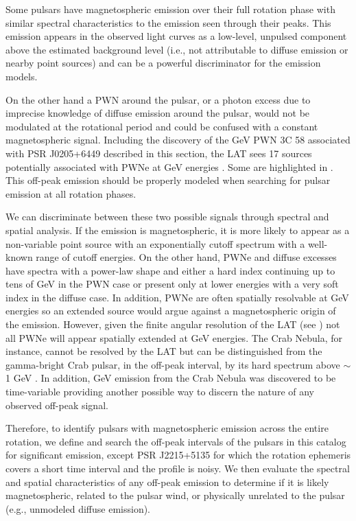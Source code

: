 Some pulsars have magnetospheric emission over their full rotation phase
with similar spectral characteristics to the emission seen through
their peaks.  This emission appears in the observed light curves as
a low-level, unpulsed component above the estimated background level
(i.e., not attributable to diffuse emission or nearby point sources)
and can be a powerful discriminator for the emission models.

On the other hand a PWN around the pulsar, or a photon excess due
to imprecise knowledge of diffuse emission around the pulsar, would
not be modulated at the rotational period and could be confused with
a constant magnetospheric signal.  Including the discovery of the GeV
PWN 3C 58 associated with PSR J0205+6449 described in this section, the
LAT sees 17 sources potentially associated with PWNe at GeV energies
\citep{acero_2013a_constraints-galactic}.  Some are highlighted in
.  This off-peak
emission should be properly modeled when searching for pulsar emission
at all rotation phases.

We can discriminate between these two possible signals through
spectral and spatial analysis.  If the emission is magnetospheric,
it is more likely to appear as a non-variable point source with
an exponentially cutoff spectrum with a well-known range of cutoff
energies.  On the other hand, PWNe and diffuse excesses have spectra
with a power-law shape and either a hard index continuing up to tens
of GeV in the PWN case or present only at lower energies with a very
soft index in the diffuse case.  In addition, PWNe are often spatially
resolvable at GeV energies \citep[e.g., Vela-X has been spatially
resolved with the LAT and \textit{AGILE} and HESS J1825$-$137 with the
LAT;][respectively]{abdo_2010c_fermi-large,pellizzoni_2010a_detection-gamma-ray,grondin_2011a_detection-pulsar}
so an extended source would argue against a magnetospheric origin
of the emission.  However, given the finite angular resolution
of the LAT (see ) not all PWNe will appear
spatially extended at GeV energies.  The Crab Nebula, for instance,
cannot be resolved by the LAT but can be distinguished from the
gamma-bright Crab pulsar, in the off-peak interval, by its hard
spectrum above $\sim$1 GeV \citep{abdo_2010a_fermi-large}.  In addition, GeV
emission from the Crab Nebula was discovered to be time-variable
\citep[e.g.,][]{abdo_2011a_gamma-ray-flares} providing another
possible way to discern the nature of any observed off-peak signal.


Therefore, to identify pulsars with magnetospheric emission across
the entire rotation, we define and search the off-peak intervals
of the pulsars in this catalog for significant emission, except PSR
J2215+5135 for which the rotation ephemeris covers a short time interval
and the profile is noisy.  We then evaluate the spectral and spatial
characteristics of any off-peak emission to determine if it is likely
magnetospheric, related to the pulsar wind, or physically unrelated to
the pulsar (e.g., unmodeled diffuse emission).
